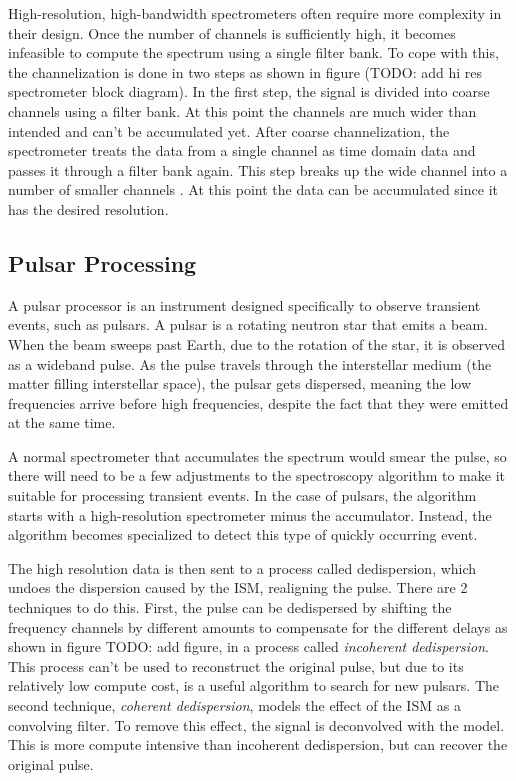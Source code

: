 High-resolution, high-bandwidth spectrometers often require more complexity in their design. 
Once the number of channels is sufficiently high, it becomes infeasible to compute the spectrum using a single filter bank. 
To cope with this, the channelization is done in two steps as shown in figure (TODO: add hi res spectrometer block diagram). 
In the first step, the signal is divided into coarse channels using a filter bank. 
At this point the channels are much wider than intended and can't be accumulated yet. 
After coarse channelization, the spectrometer treats the data from a single channel as time domain data and passes it through a filter bank again. 
This step breaks up the wide channel into a number of smaller channels . At this point the data can be accumulated since it has the desired resolution.

\subsection{Pulsar Processing}
A pulsar processor is an instrument designed specifically to observe transient events, such as pulsars. 
A pulsar is a rotating neutron star that emits a beam. 
When the beam sweeps past Earth, due to the rotation of the star, it is observed as a wideband pulse. 
As the pulse travels through the interstellar medium (the matter filling interstellar space), the pulsar gets dispersed, meaning the low frequencies arrive before high frequencies, despite the fact that they were emitted at the same time. 

A normal spectrometer that accumulates the spectrum would smear the pulse, so there will need to be a few adjustments to the spectroscopy algorithm to make it suitable for processing transient events. 
In the case of pulsars, the algorithm starts with a high-resolution spectrometer minus the accumulator. 
Instead, the algorithm becomes specialized to detect this type of quickly occurring event.

The high resolution data is then sent to a process called dedispersion, which undoes the dispersion caused by the ISM, realigning the pulse.
There are 2 techniques to do this.
First, the pulse can be dedispersed by shifting the frequency channels by different amounts to compensate for the different delays as shown in figure TODO: add figure, in a process called \emph{incoherent dedispersion}.
This process can't be used to reconstruct the original pulse, but due to its relatively low compute cost, is a useful algorithm to search for new pulsars.
The second technique, \emph{coherent dedispersion}, models the effect of the ISM as a convolving filter. 
To remove this effect, the signal is deconvolved with the model.
This is more compute intensive than incoherent dedispersion, but can recover the original pulse.

